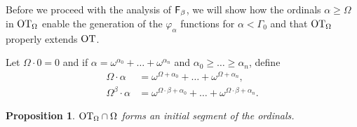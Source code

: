 \documentclass[UKenglish,cleveref,DIV=12]{scrartcl}
\newtheorem{proposition}[lemma]{Proposition}
\theoremstyle{definition}
\theoremstyle{definition}
\begin{document}
Before we proceed with the analysis of $\mathsf{F}_\beta$, we will show how the ordinals
$\alpha\ge\Omega$ in $\mathrm{OT}_\Omega$ enable the generation of the $\varphi_\alpha$
functions for $\alpha<\Gamma_0$ and that $\mathrm{OT}_\Omega$ properly extends $\mathrm{OT}$.

Let $\Omega\cdot0=0$ and if $\alpha=\omega^{\alpha_0}+\dots+\omega^{\alpha_n}$
and $\alpha_0\ge\dots\ge\alpha_n$, define
\begin{align*}
  \Omega\cdot\alpha&=\omega^{\Omega+\alpha_0}+\dots+\omega^{\Omega+\alpha_n},\\
  \Omega^\beta\cdot\alpha&=\omega^{\Omega\cdot\beta+\alpha_0}+
\dots+\omega^{\Omega\cdot\beta+\alpha_n}.
\end{align*}
\begin{proposition}\label{extprop:thetaord}
 $\mathrm{OT}_\Omega\cap \Omega$ forms an initial segment of the ordinals.
\end{proposition}
\end{document}
